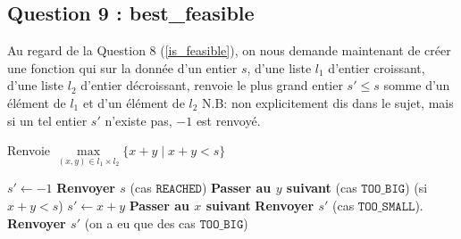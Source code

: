 \documentclass[10pt]{article}
\begin{document}
			\subsection{Question 9 : best\_feasible}\label{best_feasible}
				Au regard de la Question 8 (\ref{is_feasible}), on nous demande maintenant de créer une fonction qui sur
				la donnée d'un entier $s$, d'une liste $l_1$ d'entier croissant, d'une liste $l_2$ d'entier décroissant,
				renvoie le plus grand entier $s' \leq s$ somme d'un élément de $l_1$ et d'un élément de $l_2$
				\newline
				\newline
				N.B: non explicitement dis dans le sujet, mais si un tel entier $s'$ n'existe pas, $-1$ est renvoyé.
				\begin{algorithm}
					\caption{Renvoie $\underset{(x, y) \in l_1 \times l_2}{\max}\{x + y \mid x + y < s\}$}
					\begin{algorithmic}[1]
							\State $s' \leftarrow -1$
										\State \textbf{Renvoyer $s$} (cas $\mathtt{REACHED}$)
										\State \textbf{Passer au $y$ suivant} (cas $\mathtt{TOO\_BIG}$)
									\Else (si $x + y < s$)
											\State $s' \leftarrow x + y$
										\EndIf
										\State \textbf{Passer au $x$ suivant}
									\EndIf
								\EndFor
								\State \textbf{Renvoyer $s'$} (cas $\mathtt{TOO\_SMALL}$).
							\EndFor
							\State \textbf{Renvoyer $s'$} (on a eu que des cas $\mathtt{TOO\_BIG}$)
						\EndFunction
					\end{algorithmic}
				\end{algorithm}
				
\end{document}
